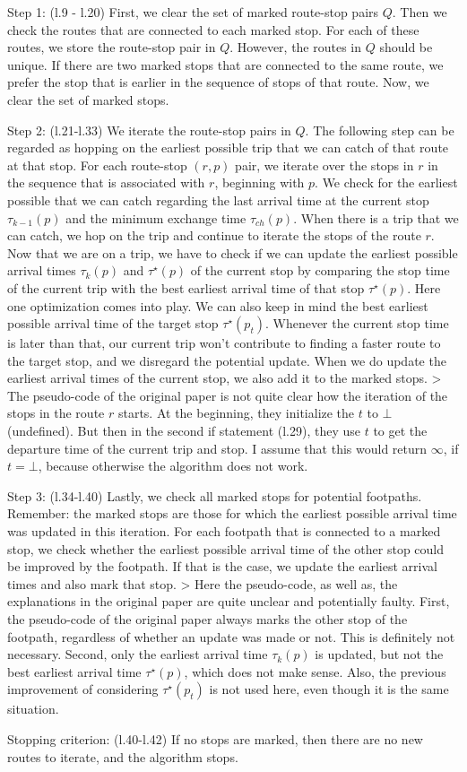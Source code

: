 Step 1: (l.9 - l.20)
First, we clear the set of marked route-stop pairs \(Q\). Then we check the routes that are connected to each marked stop. For each of these routes, we store the route-stop pair in \(Q\). However, the routes in \(Q\) should be unique. If there are two marked stops that are connected to the same route, we prefer the stop that is earlier in the sequence of stops of that route. Now, we clear the set of marked stops.

Step  2: (l.21-l.33)
We iterate the route-stop pairs in \(Q\). The following step can be regarded as hopping on the earliest possible trip that we can catch of that route at that stop. For each route-stop \((r,p)\) pair, we iterate over the stops in \(r\) in the sequence that is associated with \(r\), beginning with \(p\). We check for the earliest possible that we can catch regarding the last arrival time at the current stop \(\tau_{k-1}(p)\) and the minimum exchange time \(\tau_{ch}(p)\). When there is a trip that we can catch, we hop on the trip and continue to iterate the stops of the route \(r\). Now that we are on a trip, we have to check if we can update the earliest possible arrival times \(\tau_k(p)\) and \(\tau^\star(p)\) of the current stop by comparing the stop time of the current trip with the best earliest arrival time of that stop \(\tau^\star(p)\). Here one optimization comes into play. We can also keep in mind the best earliest possible arrival time of the target stop \(\tau^\star(p_t)\). Whenever the current stop time is later than that, our current trip won't contribute to finding a faster route to the target stop, and we disregard the potential update. When we do update the earliest arrival times of the current stop, we also add it to the marked stops.
> The pseudo-code of the original paper is not quite clear how the iteration of the stops in the route \(r\) starts. At the beginning, they initialize the \(t\) to \(\bot\) (undefined). But then in the second if statement (l.29), they use \(t\) to get the departure time of the current trip and stop. I assume that this would return \(\infty\), if \(t=\bot\), because otherwise the algorithm does not work.

Step 3: (l.34-l.40)
Lastly, we check all marked stops for potential footpaths. Remember: the marked stops are those for which the earliest possible arrival time was updated in this iteration. For each footpath that is connected to a marked stop, we check whether the earliest possible arrival time of the other stop could be improved by the footpath. If that is the case, we update the earliest arrival times and also mark that stop.
> Here the pseudo-code, as well as, the explanations in the original paper are quite unclear and potentially faulty. First, the pseudo-code of the original paper always marks the other stop of the footpath, regardless of whether an update was made or not. This is definitely not necessary. Second, only the earliest arrival time \(\tau_k(p)\) is updated, but not the best earliest arrival time \(\tau^\star(p)\), which does not make sense. Also, the previous improvement of considering \(\tau^\star(p_t)\) is not used here, even though it is the same situation.

Stopping criterion: (l.40-l.42)
If no stops are marked, then there are no new routes to iterate, and the algorithm stops.
